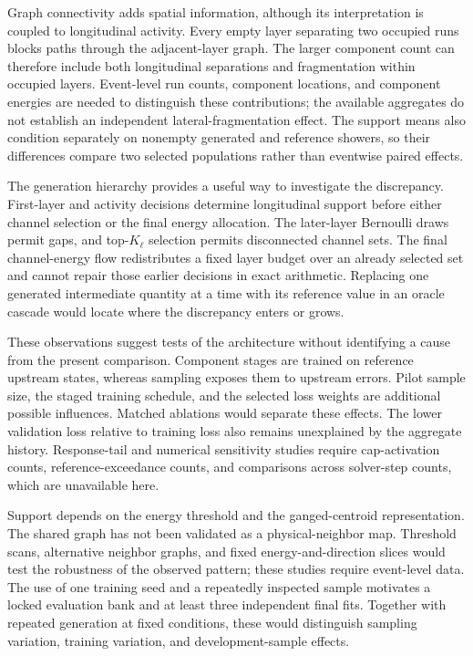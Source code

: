 \documentclass[11pt]{article}
\begin{document}
Graph connectivity adds spatial information, although its interpretation is coupled to longitudinal activity. Every empty layer separating two occupied runs blocks paths through the adjacent-layer graph. The larger component count can therefore include both longitudinal separations and fragmentation within occupied layers. Event-level run counts, component locations, and component energies are needed to distinguish these contributions; the available aggregates do not establish an independent lateral-fragmentation effect. The support means also condition separately on nonempty generated and reference showers, so their differences compare two selected populations rather than eventwise paired effects.

The generation hierarchy provides a useful way to investigate the discrepancy. First-layer and activity decisions determine longitudinal support before either channel selection or the final energy allocation. The later-layer Bernoulli draws permit gaps, and top-$K_\ell$ selection permits disconnected channel sets. The final channel-energy flow redistributes a fixed layer budget over an already selected set and cannot repair those earlier decisions in exact arithmetic. Replacing one generated intermediate quantity at a time with its reference value in an oracle cascade would locate where the discrepancy enters or grows.

These observations suggest tests of the architecture without identifying a cause from the present comparison. Component stages are trained on reference upstream states, whereas sampling exposes them to upstream errors. Pilot sample size, the staged training schedule, and the selected loss weights are additional possible influences. Matched ablations would separate these effects. The lower validation loss relative to training loss also remains unexplained by the aggregate history. Response-tail and numerical sensitivity studies require cap-activation counts, reference-exceedance counts, and comparisons across solver-step counts, which are unavailable here.

Support depends on the energy threshold and the ganged-centroid representation. The shared graph has not been validated as a physical-neighbor map. Threshold scans, alternative neighbor graphs, and fixed energy-and-direction slices would test the robustness of the observed pattern; these studies require event-level data. The use of one training seed and a repeatedly inspected sample motivates a locked evaluation bank and at least three independent final fits. Together with repeated generation at fixed conditions, these would distinguish sampling variation, training variation, and development-sample effects.
\end{document}
